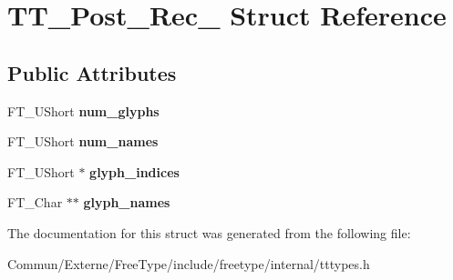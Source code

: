 \hypertarget{struct_t_t___post__20_rec__}{}\section{T\+T\+\_\+\+Post\+\_\+Rec\+\_\+ Struct Reference}
\label{struct_t_t___post__20_rec__}
\subsection*{Public Attributes}
\begin{DoxyCompactItemize}
\item 
F\+T\+\_\+\+U\+Short {\bfseries num\+\_\+glyphs}\hypertarget{struct_t_t___post__20_rec___ae3de3677810e6581f2c197e8fa902979}{}\label{struct_t_t___post__20_rec___ae3de3677810e6581f2c197e8fa902979}

\item 
F\+T\+\_\+\+U\+Short {\bfseries num\+\_\+names}\hypertarget{struct_t_t___post__20_rec___af726ff4997521c76de36f76e1203e2b1}{}\label{struct_t_t___post__20_rec___af726ff4997521c76de36f76e1203e2b1}

\item 
F\+T\+\_\+\+U\+Short $\ast$ {\bfseries glyph\+\_\+indices}\hypertarget{struct_t_t___post__20_rec___a7f0a07ab96ccbe2597378f7aa2de3f8c}{}\label{struct_t_t___post__20_rec___a7f0a07ab96ccbe2597378f7aa2de3f8c}

\item 
F\+T\+\_\+\+Char $\ast$$\ast$ {\bfseries glyph\+\_\+names}\hypertarget{struct_t_t___post__20_rec___a8330fbc7db3659ac621e98d7ceb8aad3}{}\label{struct_t_t___post__20_rec___a8330fbc7db3659ac621e98d7ceb8aad3}

\end{DoxyCompactItemize}


The documentation for this struct was generated from the following file\+:\begin{DoxyCompactItemize}
\item 
Commun/\+Externe/\+Free\+Type/include/freetype/internal/tttypes.\+h\end{DoxyCompactItemize}
